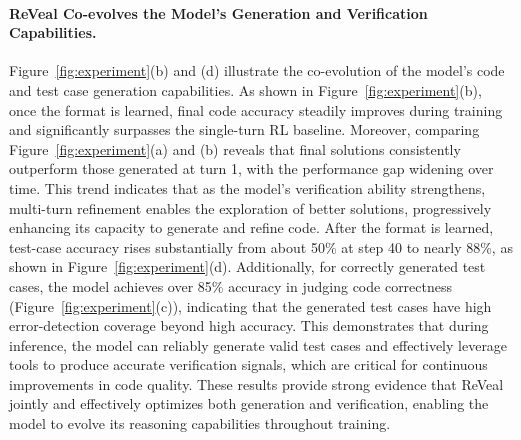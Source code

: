 \documentclass{article} %
\begin{document}
\paragraph{ReVeal Co-evolves the Model's Generation and Verification Capabilities.} 
Figure~\ref{fig:experiment}(b) and (d) illustrate the co-evolution of the model's code and test case generation capabilities. As shown in Figure~\ref{fig:experiment}(b), once the format is learned, final code accuracy steadily improves during training and significantly surpasses the single-turn RL baseline. Moreover, comparing Figure~\ref{fig:experiment}(a) and (b) reveals that final solutions consistently outperform those generated at turn 1, with the performance gap widening over time. This trend indicates that as the model's verification ability strengthens, multi-turn refinement enables the exploration of better solutions, progressively enhancing its capacity to generate and refine code. After the format is learned, test-case accuracy rises substantially from about 50\% at step 40 to nearly 88\%, as shown in Figure~\ref{fig:experiment}(d). Additionally, for correctly generated test cases, the model achieves over 85\% accuracy in judging code correctness (Figure~\ref{fig:experiment}(c)), indicating that the generated test cases have high error-detection coverage beyond high accuracy. This demonstrates that during inference, the model can reliably generate valid test cases and effectively leverage tools to produce accurate verification signals, which are critical for continuous improvements in code quality. These results provide strong evidence that ReVeal jointly and effectively optimizes both generation and verification, enabling the model to evolve its reasoning capabilities throughout training.
\end{document}

